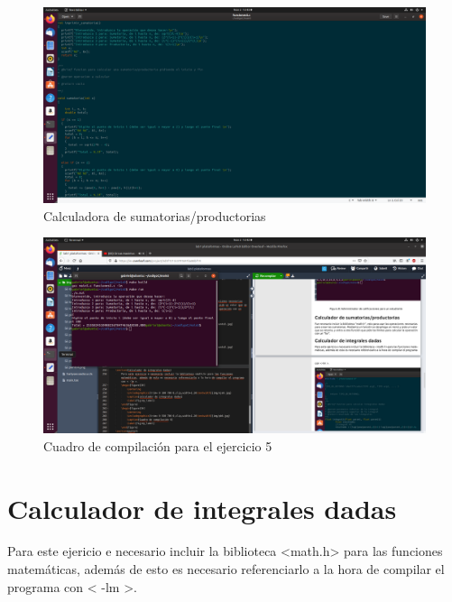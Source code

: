 \documentclass[
  letterpaper, 
  maincolor=black,
  sectioncolor=black!90,
  subsectioncolor=black!70,
  itemtextcolor=black!40,
]{fortysecondscv}
\begin{document}
        \begin{figure}[H]
            \centering
            \includegraphics[trim= 50 0 580 50,clip,width=1.20\textwidth]{img/punto5.png}
            \caption{Calculadora de sumatorias/productorias}
            \label{fig:my_label}
        \end{figure}
        \begin{figure}[H]
            \centering
            \includegraphics[trim= 130 500 915 180,clip,width=1.20\textwidth]{img/punto5-5.png}
            \caption{Cuadro de compilación para el ejercicio 5}
            \label{fig:my_label}
        \end{figure}
        \newpage
        
    \section{Calculador de integrales dadas}
        Para este ejericio e necesario incluir la biblioteca <math.h> para las funciones matemáticas, además de esto es necesario referenciarlo a la hora de compilar el programa con < -lm >.
        
\end{document}

